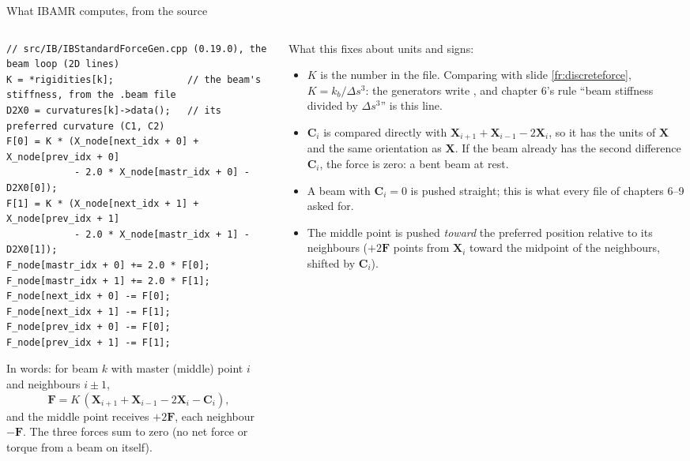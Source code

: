 \documentclass[aspectratio=169,11pt]{beamer}
\begin{document}
\begin{frame}[fragile]{What IBAMR computes, from the source}
\label{fr:verified}
\begin{columns}[T,onlytextwidth]
\begin{column}{0.55\textwidth}
\begin{lstlisting}[style=cpptiny]
// src/IB/IBStandardForceGen.cpp (0.19.0), the beam loop (2D lines)
K = *rigidities[k];             // the beam's stiffness, from the .beam file
D2X0 = curvatures[k]->data();   // its preferred curvature (C1, C2)
F[0] = K * (X_node[next_idx + 0] + X_node[prev_idx + 0]
            - 2.0 * X_node[mastr_idx + 0] - D2X0[0]);
F[1] = K * (X_node[next_idx + 1] + X_node[prev_idx + 1]
            - 2.0 * X_node[mastr_idx + 1] - D2X0[1]);
F_node[mastr_idx + 0] += 2.0 * F[0];
F_node[mastr_idx + 1] += 2.0 * F[1];
F_node[next_idx + 0] -= F[0];
F_node[next_idx + 1] -= F[1];
F_node[prev_idx + 0] -= F[0];
F_node[prev_idx + 1] -= F[1];
\end{lstlisting}
\footnotesize In words: for beam $k$ with master (middle) point $i$ and neighbours $i \pm 1$,
\[
  \mathbf{F} = K\,(\mathbf{X}_{i+1} + \mathbf{X}_{i-1} - 2\mathbf{X}_i - \mathbf{C}_i),
\]
and the middle point receives $+2\mathbf{F}$, each neighbour $-\mathbf{F}$. The three forces sum to zero (no net force or torque from a beam on itself).
\end{column}
\begin{column}{0.43\textwidth}
\scriptsize What this fixes about units and signs:
\begin{itemize}
  \item $K$ is the number in the  file. Comparing with slide \ref{fr:discreteforce}, $K = k_b/\Delta s^3$: the generators write , and chapter 6's rule ``beam stiffness divided by $\Delta s^3$'' is this line.
  \item $\mathbf{C}_i$ is compared directly with $\mathbf{X}_{i+1} + \mathbf{X}_{i-1} - 2\mathbf{X}_i$, so it has the units of $\mathbf{X}$ and the same orientation as $\mathbf{X}$. If the beam already has the second difference $\mathbf{C}_i$, the force is zero: a bent beam at rest.
  \item A beam with $\mathbf{C}_i = 0$ is pushed straight; this is what every  file of chapters 6--9 asked for.
  \item The middle point is pushed \emph{toward} the preferred position relative to its neighbours ($+2\mathbf{F}$ points from $\mathbf{X}_i$ toward the midpoint of the neighbours, shifted by $\mathbf{C}_i$).
\end{itemize}
\end{column}
\end{columns}
\end{frame}
\end{document}
